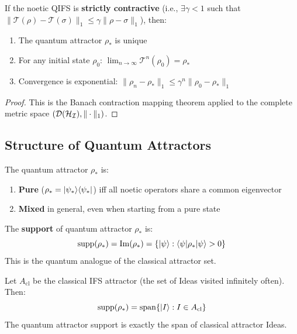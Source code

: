 \begin{theorem}
\label{thm:attractor-convergence}
If the noetic QIFS is \textbf{strictly contractive} (i.e., $\exists \gamma < 1$ such that $\|\mathcal{T}(\rho) - \mathcal{T}(\sigma)\|_1 \leq \gamma \|\rho - \sigma\|_1$), then:
\begin{enumerate}
  \item The quantum attractor $\rho_*$ is unique
  \item For any initial state $\rho_0$: $\lim_{n \to \infty} \mathcal{T}^n(\rho_0) = \rho_*$
  \item Convergence is exponential: $\|\rho_n - \rho_*\|_1 \leq \gamma^n \|\rho_0 - \rho_*\|_1$
\end{enumerate}
\end{theorem}

\begin{proof}
This is the Banach contraction mapping theorem applied to the complete metric space $(\mathcal{D}(\mathcal{H}_{\mathcal{I}}), \|\cdot\|_1)$.
\end{proof}

\subsection{Structure of Quantum Attractors}

\begin{proposition}
\label{prop:attractor-purity}
The quantum attractor $\rho_*$ is:
\begin{enumerate}
  \item \textbf{Pure} ($\rho_* = |\psi_*\rangle\langle \psi_*|$) iff all noetic operators share a common eigenvector
  \item \textbf{Mixed} in general, even when starting from a pure state
\end{enumerate}
\end{proposition}

\begin{definition}
\label{def:attractor-support}
The \textbf{support} of quantum attractor $\rho_*$ is:
\[
\mathrm{supp}(\rho_*) = \mathrm{Im}(\rho_*) = \{|\psi\rangle : \langle \psi|\rho_*|\psi\rangle > 0\}
\]
This is the quantum analogue of the classical attractor set.
\end{definition}

\begin{theorem}
\label{thm:attractor-support-classical}
Let $A_{\mathrm{cl}}$ be the classical IFS attractor (the set of Ideas visited infinitely often). Then:
\[
\mathrm{supp}(\rho_*) = \mathrm{span}\{|I\rangle : I \in A_{\mathrm{cl}}\}
\]
The quantum attractor support is exactly the span of classical attractor Ideas.
\end{theorem}

